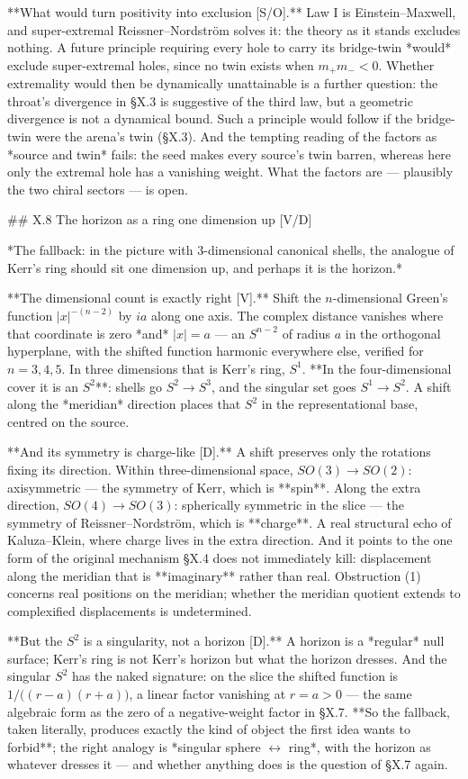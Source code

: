 **What would turn positivity into exclusion [S/O].** Law I is Einstein–Maxwell, and super-extremal Reissner–Nordström solves it: the theory as it stands excludes nothing. A future principle requiring every hole to carry its bridge-twin *would* exclude super-extremal holes, since no twin exists when $m_+m_-<0$. Whether extremality would then be dynamically unattainable is a further question: the throat's divergence in §X.3 is suggestive of the third law, but a geometric divergence is not a dynamical bound. Such a principle would follow if the bridge-twin were the arena's twin (§X.3). And the tempting reading of the factors as *source and twin* fails: the seed makes every source's twin barren, whereas here only the extremal hole has a vanishing weight. What the factors are — plausibly the two chiral sectors — is open.

## X.8 The horizon as a ring one dimension up [V/D]

*The fallback: in the picture with 3-dimensional canonical shells, the analogue of Kerr's ring should sit one dimension up, and perhaps it is the horizon.*

**The dimensional count is exactly right [V].** Shift the $n$-dimensional Green's function $|x|^{-(n-2)}$ by $ia$ along one axis. The complex distance vanishes where that coordinate is zero *and* $|x| = a$ — an $S^{n-2}$ of radius $a$ in the orthogonal hyperplane, with the shifted function harmonic everywhere else, verified for $n = 3,4,5$. In three dimensions that is Kerr's ring, $S^1$. **In the four-dimensional cover it is an $S^2$**: shells go $S^2\to S^3$, and the singular set goes $S^1\to S^2$. A shift along the *meridian* direction places that $S^2$ in the representational base, centred on the source.

**And its symmetry is charge-like [D].** A shift preserves only the rotations fixing its direction. Within three-dimensional space, $SO(3)\to SO(2)$: axisymmetric — the symmetry of Kerr, which is **spin**. Along the extra direction, $SO(4)\to SO(3)$: spherically symmetric in the slice — the symmetry of Reissner–Nordström, which is **charge**. A real structural echo of Kaluza–Klein, where charge lives in the extra direction. And it points to the one form of the original mechanism §X.4 does not immediately kill: displacement along the meridian that is **imaginary** rather than real. Obstruction (1) concerns real positions on the meridian; whether the meridian quotient extends to complexified displacements is undetermined.

**But the $S^2$ is a singularity, not a horizon [D].** A horizon is a *regular* null surface; Kerr's ring is not Kerr's horizon but what the horizon dresses. And the singular $S^2$ has the naked signature: on the slice the shifted function is $1/\big((r-a)(r+a)\big)$, a linear factor vanishing at $r = a>0$ — the same algebraic form as the zero of a negative-weight factor in §X.7. **So the fallback, taken literally, produces exactly the kind of object the first idea wants to forbid**; the right analogy is *singular sphere $\leftrightarrow$ ring*, with the horizon as whatever dresses it — and whether anything does is the question of §X.7 again.

